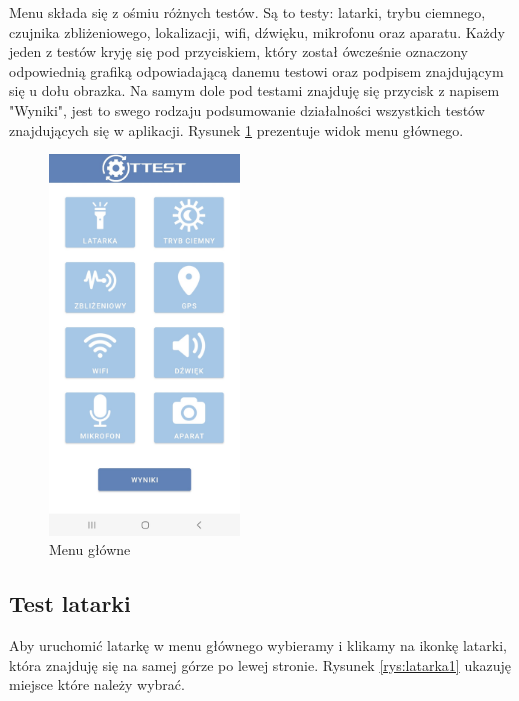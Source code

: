 \newpage


Menu składa się z ośmiu różnych testów. Są to testy: latarki, trybu ciemnego, czujnika zbliżeniowego, lokalizacji, wifi, dźwięku, mikrofonu oraz aparatu. Każdy jeden z testów kryję się pod przyciskiem, który został ówcześnie oznaczony odpowiednią grafiką odpowiadającą danemu testowi oraz podpisem znajdującym się u dołu obrazka. Na samym dole pod testami znajduję się przycisk z napisem "Wyniki", jest to swego rodzaju podsumowanie działalności wszystkich testów znajdujących się w aplikacji. Rysunek \ref{rys:menu1} prezentuje widok menu głównego.

\begin{figure}[!hbt]
	\begin{center}
		\includegraphics[angle=360, width=0.45\textwidth]{rys/punkt6/menu1.jpg}
		\caption{Menu główne}
		\label{rys:menu1}
	\end{center}
\end{figure}

\newpage


\subsection{Test latarki} 

\hspace{0.60cm}Aby uruchomić latarkę w menu głównego wybieramy i klikamy na ikonkę latarki, która znajduję się na samej górze po lewej stronie. Rysunek \ref{rys:latarka1} ukazuję miejsce które należy wybrać. 

